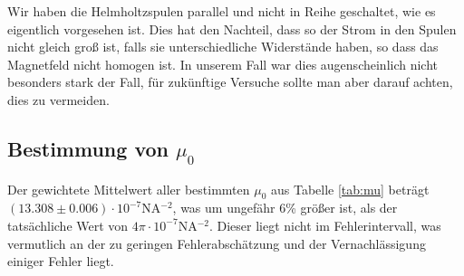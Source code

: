 \documentclass[12pt,a4paper,titlepage,headinclude,bibtotoc]{scrartcl}
\begin{document}
Wir haben die Helmholtzspulen parallel und nicht in Reihe geschaltet, wie es eigentlich vorgesehen ist.
Dies hat den Nachteil, dass so der Strom in den Spulen nicht gleich groß ist, falls sie unterschiedliche Widerstände haben, so dass das Magnetfeld nicht homogen ist.
In unserem Fall war dies augenscheinlich nicht besonders stark der Fall, für zukünftige Versuche sollte man aber darauf achten, dies zu vermeiden.

\subsection{Bestimmung von $\mu_0$}
Der gewichtete Mittelwert aller bestimmten $\mu_0$ aus Tabelle \ref{tab:mu} beträgt  $(13.308\pm 0.006)\cdot 10^{-7}\si{\newton\ampere^{-2}}$, was um ungefähr 6\% größer ist, als der tatsächliche Wert von $4\pi\cdot10^{-7}\si{\newton\ampere^{-2}}$.
Dieser liegt nicht im Fehlerintervall, was vermutlich an der zu geringen Fehlerabschätzung und der Vernachlässigung einiger Fehler liegt.



\end{document}
